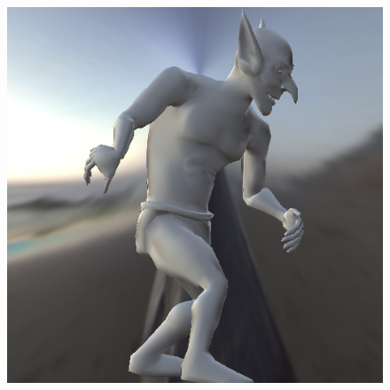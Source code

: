 \begin{figure}[H]
\endminipage\hfill
{}%
  \includegraphics[width=\linewidth]{./Imagens/brdfs/aniso-goblin.png}
\endminipage
\end{figure}

